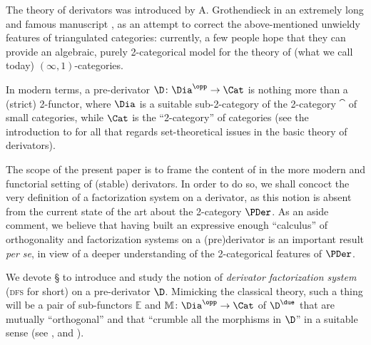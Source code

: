 The theory of derivators was introduced by A\@. Grothendieck in an extremely long and famous manuscript \cite{tendieckderiv}, as an attempt to correct the above\hyp{}mentioned unwieldy features of triangulated categories: currently, a few people hope that they can provide an algebraic, purely 2-categorical model for the theory of (what we call today) $(\infty,1)$\hyp{}categories.

In modern terms, a pre-derivator $\D\colon \Dia^\opp\to\Cat$ is nothing more than a (strict) 2-functor, where $\Dia$ is a suitable sub\hyp{}2\hyp{}category of the 2-category $\cat$ of small categories, while $\Cat$ is the ``2-category'' of categories (see the introduction to \cite{Moritz} for all that regards set-theoretical issues in the basic theory of derivators).

The scope of the present paper is to frame the content of \cite{t_structures_are_tnnts} in the more modern and functorial setting of (stable) derivators. In order to do so, we shall concoct the very definition of a factorization system on a derivator, as this notion is absent from the current state of the art about the 2\hyp{}category $\PDer$. As an aside comment, we believe that having built an expressive enough ``calculus'' of orthogonality and factorization systems on a (pre)derivator is an important result \emph{per se}, in view of a deeper understanding of the 2\hyp{}categorical features of $\PDer$.

We devote § to introduce and study the notion of \emph{derivator factorization system} (\textsc{dfs} for short) on a pre-derivator $\D$. Mimicking the classical theory, such a thing will be a pair of sub-functors $\mathbb E$ and $\mathbb M\colon \Dia^\opp\to\Cat$ of $\D^\due$ that are mutually ``orthogonal'' and that ``crumble all the morphisms in $\D$'' in a suitable sense (see \adef{},  and ).

